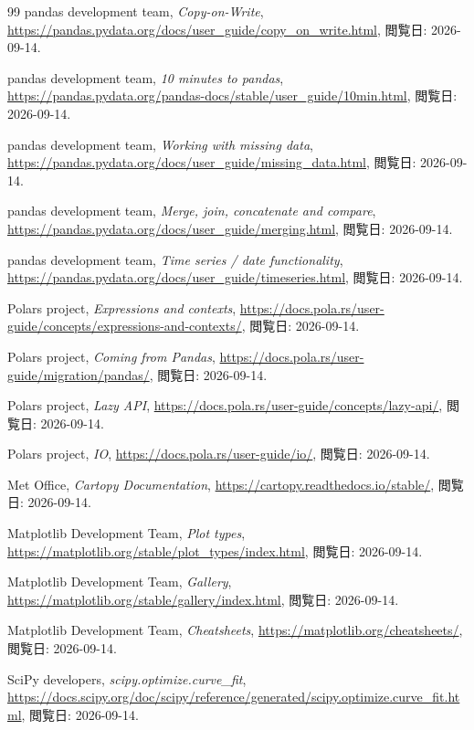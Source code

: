 \begin{thebibliography}{99}
pandas development team,
\textit{Copy-on-Write},
\url{https://pandas.pydata.org/docs/user_guide/copy_on_write.html},
閲覧日: 2026-09-14.

pandas development team,
\textit{10 minutes to pandas},
\url{https://pandas.pydata.org/pandas-docs/stable/user_guide/10min.html},
閲覧日: 2026-09-14.

pandas development team,
\textit{Working with missing data},
\url{https://pandas.pydata.org/docs/user_guide/missing_data.html},
閲覧日: 2026-09-14.

pandas development team,
\textit{Merge, join, concatenate and compare},
\url{https://pandas.pydata.org/docs/user_guide/merging.html},
閲覧日: 2026-09-14.

pandas development team,
\textit{Time series / date functionality},
\url{https://pandas.pydata.org/docs/user_guide/timeseries.html},
閲覧日: 2026-09-14.

Polars project,
\textit{Expressions and contexts},
\url{https://docs.pola.rs/user-guide/concepts/expressions-and-contexts/},
閲覧日: 2026-09-14.

Polars project,
\textit{Coming from Pandas},
\url{https://docs.pola.rs/user-guide/migration/pandas/},
閲覧日: 2026-09-14.

Polars project,
\textit{Lazy API},
\url{https://docs.pola.rs/user-guide/concepts/lazy-api/},
閲覧日: 2026-09-14.

Polars project,
\textit{IO},
\url{https://docs.pola.rs/user-guide/io/},
閲覧日: 2026-09-14.

Met Office,
\textit{Cartopy Documentation},
\url{https://cartopy.readthedocs.io/stable/},
閲覧日: 2026-09-14.

Matplotlib Development Team,
\textit{Plot types},
\url{https://matplotlib.org/stable/plot_types/index.html},
閲覧日: 2026-09-14.

Matplotlib Development Team,
\textit{Gallery},
\url{https://matplotlib.org/stable/gallery/index.html},
閲覧日: 2026-09-14.

Matplotlib Development Team,
\textit{Cheatsheets},
\url{https://matplotlib.org/cheatsheets/},
閲覧日: 2026-09-14.

SciPy developers,
\textit{scipy.optimize.curve\_fit},
\url{https://docs.scipy.org/doc/scipy/reference/generated/scipy.optimize.curve_fit.html},
閲覧日: 2026-09-14.


\end{thebibliography}
